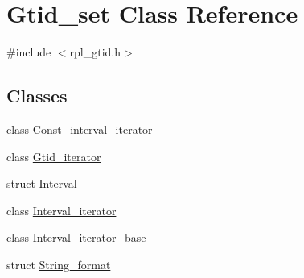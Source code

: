 \hypertarget{classGtid__set}{}\section{Gtid\+\_\+set Class Reference}
\label{classGtid__set}


{\ttfamily \#include $<$rpl\+\_\+gtid.\+h$>$}

\subsection*{Classes}
\begin{DoxyCompactItemize}
\item 
class \mbox{\hyperlink{classGtid__set_1_1Const__interval__iterator}{Const\+\_\+interval\+\_\+iterator}}
\item 
class \mbox{\hyperlink{classGtid__set_1_1Gtid__iterator}{Gtid\+\_\+iterator}}
\item 
struct \mbox{\hyperlink{structGtid__set_1_1Interval}{Interval}}
\item 
class \mbox{\hyperlink{classGtid__set_1_1Interval__iterator}{Interval\+\_\+iterator}}
\item 
class \mbox{\hyperlink{classGtid__set_1_1Interval__iterator__base}{Interval\+\_\+iterator\+\_\+base}}
\item 
struct \mbox{\hyperlink{structGtid__set_1_1String__format}{String\+\_\+format}}
\end{DoxyCompactItemize}
